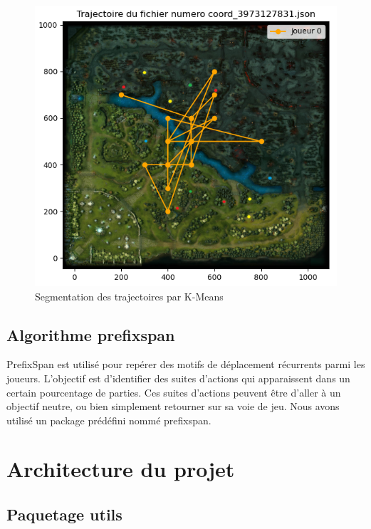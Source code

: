 \documentclass{article}
\begin{document}
        \begin{figure}[htbp]
            \centering
            \includegraphics[scale=0.4]{img/example_kmean.png}
            \caption{Segmentation des trajectoires par K-Means}
            \label{test_mdl}
        \end{figure}
        
        \subsection{Algorithme prefixspan}
         PrefixSpan est utilisé pour repérer des motifs de déplacement récurrents parmi les joueurs. L'objectif est d’identifier des suites d’actions qui apparaissent dans un certain pourcentage de parties. Ces suites d'actions peuvent être d'aller à un objectif neutre, ou bien simplement retourner sur sa voie de jeu. Nous avons utilisé un package prédéfini nommé prefixspan.
        

    \section{Architecture du projet}
        \begin{center}
            \resizebox{1.0\textwidth}{!}{}
        \end{center}
        \subsection{Paquetage utils}
        
\end{document}
